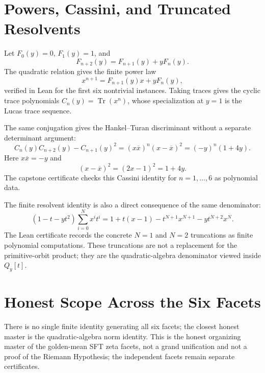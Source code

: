 \section{Powers, Cassini, and Truncated Resolvents}
\label{sec:window6-quadratic-capstone-consequences}

Let $F_0(y)=0$, $F_1(y)=1$, and
$$
F_{n+2}(y)=F_{n+1}(y)+yF_n(y).
$$
The quadratic relation gives the finite power law
$$
x^{n+1}=F_{n+1}(y)x+yF_n(y),
$$
verified in Lean for the first six nontrivial instances. Taking traces gives the cyclic trace polynomials $C_n(y)=\operatorname{Tr}(x^n)$, whose specialization at $y=1$ is the Lucas trace sequence.

The same conjugation gives the Hankel--Turan discriminant without a separate determinant argument:
$$
C_n(y)C_{n+2}(y)-C_{n+1}(y)^2=(x\overline{x})^n(x-\overline{x})^2=(-y)^n(1+4y).
$$
Here $x\overline{x}=-y$ and
$$
(x-\overline{x})^2=(2x-1)^2=1+4y.
$$
The capstone certificate checks this Cassini identity for $n=1,\ldots,6$ as polynomial data.

The finite resolvent identity is also a direct consequence of the same denominator:
$$
(1-t-yt^2)\sum_{i=0}^{N}x^i t^i
=1+t(x-1)-t^{N+1}x^{N+1}-y t^{N+2}x^N.
$$
The Lean certificate records the concrete $N=1$ and $N=2$ truncations as finite polynomial computations. These truncations are not a replacement for the primitive-orbit product; they are the quadratic-algebra denominator viewed inside $Q_y[t]$.

\section{Honest Scope Across the Six Facets}
\label{sec:window6-quadratic-capstone-scope}

There is no single finite identity generating all six facets; the closest honest master is the quadratic-algebra norm identity. This is the honest organizing master of the golden-mean SFT zeta facets, not a grand unification and not a proof of the Riemann Hypothesis; the independent facets remain separate certificates.

